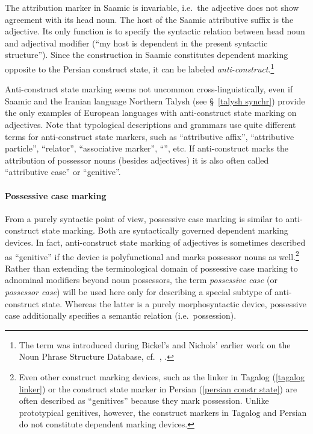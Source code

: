 The attribution marker in Saamic is invariable, i.e.~the adjective does not show agreement with its head noun. The host of the Saamic attributive suffix is the adjective. Its only function is to specify the syntactic relation between head noun and adjectival modifier (“my host is dependent in the present syntactic structure”). Since the construction in Saamic constitutes dependent marking opposite to the Persian construct state, it can be labeled \emph{anti\hyp{}construct}.\footnote{The term was introduced during Bickel's and Nichols' earlier work on the  Noun Phrase Structure Database, cf.~\citet[2, elsewhere]{bickel-etal2002}, \citet{AUTOTYP-NP}.} 

Anti\hyp{}construct state marking seems not uncommon cross-linguistically, even if Saamic and the Iranian language Northern Talysh (see \S~\ref{talysh synchr}) provide the only examples of European languages with anti\hyp{}construct state marking on adjectives. Note that typological descriptions and grammars use quite different terms for anti\hyp{}construct state markers, such as “attributive affix”, “attributive particle”, “relator”, “associative marker”, “”, etc. If anti\hyp{}construct marks the attribution of possessor nouns (besides adjectives) it is also often called “attributive case” or “genitive”.

\paragraph{Possessive case marking} 
From a purely syntactic point of view, possessive case marking is similar to anti\hyp{}construct state marking. Both are syntactically governed dependent marking devices. In fact, anti\hyp{}construct state marking of adjectives is sometimes described as “genitive” if the device is polyfunctional and marks possessor nouns as well.\footnote{Even other construct marking devices, such as the linker in Tagalog (\ref{tagalog linker}) or the construct state marker in Persian (\ref{persian constr state}) are often described as “genitives” because they mark possession. Unlike prototypical genitives, however, the construct markers in Tagalog and Persian do not constitute dependent marking devices.} Rather than extending the terminological domain of possessive case marking to adnominal modifiers beyond noun possessors, the term \emph{possessive case} (or \emph{possessor case}) will be used here only for describing a special subtype of anti\hyp{}construct state. Whereas the latter is a purely morphosyntactic device, possessive case additionally specifies a semantic relation (i.e.~possession).

